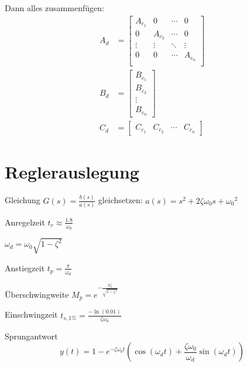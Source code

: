 \documentclass[11pt,a4paper,fleqn,headsepline]{scrreprt}
\begin{document}
\begin{multicols}{2}
        Dann alles zusammenfügen:
        \begin{align*}
            A_d &= \begin{bmatrix}
                A_{c_1} & 0 & \cdots & 0 \\
                0 & A_{c_2} & \cdots & 0 \\
                \vdots & \vdots & \ddots & \vdots \\
                0 & 0 & \cdots & A_{c_n} \\
            \end{bmatrix} \\
            B_d &= \begin{bmatrix}
                B_{c_1} \\ B_{c_2} \\ \vdots \\ B_{c_n}
            \end{bmatrix} \\
            C_d &= \begin{bmatrix}
                C_{c_1} & C_{c_2} & \cdots & C_{c_n}
            \end{bmatrix}
        \end{align*}

        \section*{Reglerauslegung}

        Gleichung \(G(s) = \frac{b(s)}{a(s)}\) gleichsetzen: \(a(s) = s^2+2\zeta\omega_0 s + {\omega_0}^2\)

        Anregelzeit \(t_r \approx \frac{1.8}{\omega_0}\)

        \(\omega_d = \omega_0 \sqrt{1-\zeta^2}\)

        Anstiegzeit \(t_p = \frac{\pi}{\omega_d}\)

        Überschwingweite \(M_p = e^{-\frac{\pi\zeta}{\sqrt{1-\zeta^2}}}\)

        Einschwingzeit \(t_{s,1\%} = \frac{-\ln(0.01)}{\zeta\omega_0}\)

        Sprungantwort
        \[y(t) = 1-e^{-\zeta\omega_0 t}\left(\cos(\omega_d t) + \frac{\zeta\omega_0}{\omega_d}\sin(\omega_d t)\right)\]


\end{multicols}
\end{document}
